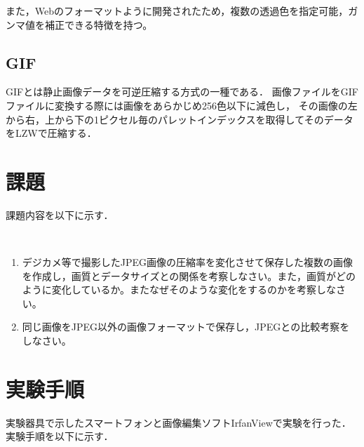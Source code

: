 \documentclass[a4paper,11pt]{bxjsarticle}
\begin{document}
また，Webのフォーマットように開発されたため，複数の透過色を指定可能，ガンマ値を補正できる特徴を持つ。

 
\subsection{GIF}
GIFとは静止画像データを可逆圧縮する方式の一種である．
画像ファイルをGIFファイルに変換する際には画像をあらかじめ256色以下に減色し，
その画像の左から右，上から下の1ピクセル毎のパレットインデックスを取得してそのデータをLZWで圧縮する．

\section{課題}
課題内容を以下に示す．

　\begin{enumerate}
    \item デジカメ等で撮影したJPEG画像の圧縮率を変化させて保存した複数の画像を作成し，画質とデータサイズとの関係を考察しなさい。また，画質がどのように変化しているか。またなぜそのような変化をするのかを考察しなさい。
    \item 同じ画像をJPEG以外の画像フォーマットで保存し，JPEGとの比較考察をしなさい。
  \end{enumerate}



\section{実験手順}
実験器具で示したスマートフォンと画像編集ソフトIrfanViewで実験を行った．
実験手順を以下に示す．\\
\end{document}
